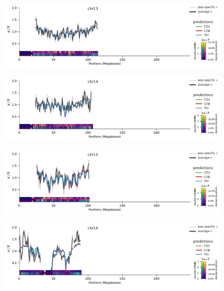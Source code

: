\documentclass[11pt]{article}
\begin{document}
\begin{figure}[!htb]
  \centering
  \includegraphics[width=\textwidth]{figures/supplementary/pred_plot_chr13.pdf}
  \label{suppfig:fit-chr13}
\end{figure}


\begin{figure}[!htb]
  \centering
  \includegraphics[width=\textwidth]{figures/supplementary/pred_plot_chr14.pdf}
  \label{suppfig:fit-chr14}
\end{figure}


\begin{figure}[!htb]
  \centering
  \includegraphics[width=\textwidth]{figures/supplementary/pred_plot_chr15.pdf}
  \label{suppfig:fit-chr15}
\end{figure}


\begin{figure}[!htb]
  \centering
  \includegraphics[width=\textwidth]{figures/supplementary/pred_plot_chr16.pdf}
  \label{suppfig:fit-chr16}
\end{figure}
\end{document}
